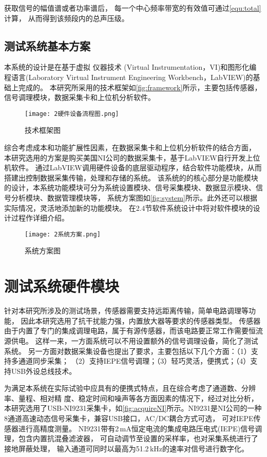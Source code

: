 获取信号的幅值谱或者功率谱后，
每一个中心频率带宽的有效值可通过\autoref{equ:total}计算，
从而得到该频段内的总声压级。

\subsection{测试系统基本方案}
本系统的设计是在基于虚拟
仪器技术 (Virtual Instrumentation，VI)和图形化编
程语言(Laboratory Virtual Instrument Engineering
Workbench，LabVIEW)的基础上完成的。
本研究所采用的技术框架如\autoref{fig:framework}所示，主要包括传感器，信号调理模块，数据采集卡和上位机分析软件。
\begin{figure}[htbp]
    \centering
    \texttt{[image: 2硬件设备流程图.png]}
    \caption{\label{fig:framework}技术框架图}
\end{figure}

综合考虑成本和功能扩展性因素，在数据采集卡和上位机分析软件的结合方面，
本研究选用的方案是购买美国NI公司的数据采集卡，基于LabVIEW自行开发上位机软件。
通过LabVIEW调用硬件设备的底层驱动程序，结合软件功能模块，从而搭建出控制数据采集传输，处理和存储的系统。
该系统的的核心部分是功能模块的设计，本系统功能模块可分为系统设置模块、信号采集模块、数据显示模块、信号分析模块、数据管理模块等，
系统方案图如\autoref{fig:system}所示。此外还可以根据实际情况，灵活地添加新的功能模块。
在2.4节软件系统设计中将对软件模块的设计过程作详细介绍。
\begin{figure}[htbp]
    \centering
    \texttt{[image: 2系统方案.png]}
    \caption{\label{fig:system}系统方案图}
\end{figure}

\section{测试系统硬件模块}
针对本研究所涉及的测试场景，传感器需要支持远距离传输，简单电路调理等功能，
因此本研究选用了抗干扰能力强，内置放大器等要求的传感器类型。
传感器由于内置了专门的集成调理电路，属于有源传感器，而该电路要正常工作需要恒流源供电。
这样一来，一方面系统可以不用设置额外的信号调理设备，简化了测试系统。
另一方面对数据采集设备也提出了要求，主要包括以下几个方面：（1）支持多通道同步采集；
（2）支持IEPE信号调理；（3）轻巧灵活，便携式；（4）支持USB外设总线技术。

为满足本系统在实际试验中应具有的便携式特点，且在综合考虑了通道数、分辨率、量程、相对精
度、稳定时间和噪声等各方面因素的情况下，经过对比分析，
本研究选用了USB-​NI9231采集卡，如\autoref{fig:acquireNI}所示。
​NI9231是NI公司的一种8通道高速动态信号采集卡，兼容USB接口，AC/DC耦合方式可选，
可对IEPE传感器进行高精度测量。
NI9231带有2\,mA恒定电流的集成电路压电式(IEPE)信号调理，包含内置抗混叠滤波器，
可自动调节至设置的采样率，也对采集系统进行了接地屏蔽处理，
输入通道可同时以最高为51.2$\mathrm{\,kHz}$的速率对信号进行数字化。

